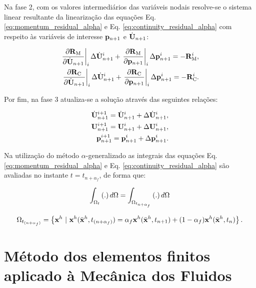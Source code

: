 \documentclass[tese_patricia]{subfiles}%
\begin{document}
Na fase 2, com os valores intermediários das variáveis nodais resolve-se o sistema linear resultante da linearização das equações Eq. \eqref{eq:momentum_residual_alpha} e Eq. \eqref{eq:continuity_residual_alpha} com respeito às variáveis de interesse $\mathbf{p}_{n+1}$ e $\dot{\mathbf{U}}_{n+1}$:

\begin{align}
\left .\frac{\partial\mathbf{R}_\mathrm{M}}{\partial\dot{\mathbf{U}}_{n+1}}\right|_{i} \Delta \dot{\mathbf{U}}_{n+1}^{i} + \left .\frac{\partial\mathbf{R}_\mathrm{M}}{\partial\mathbf{p}_{n+1}}\right|_{i} \Delta \mathbf{p}_{n+1}^{i} = -\mathbf{R}_\mathrm{M}^{i}, \label{eq:NR1} \\
\left .\frac{\partial\mathbf{R}_\mathrm{C}}{\partial\dot{\mathbf{U}}_{n+1}}\right|_{i} \Delta \dot{\mathbf{U}}_{n+1}^{i} + \left .\frac{\partial\mathbf{R}_\mathrm{C}}{\partial\mathbf{p}_{n+1}}\right|_{i} \Delta \mathbf{p}_{n+1}^{i} = -\mathbf{R}_\mathrm{C}^{i}.\label{eq:NR2}
\end{align}

Por fim, na fase 3 atualiza-se a solução através das seguintes relações:

\begin{align}
\dot{\mathbf{U}}_{n+1}^{i+1} = \dot{\mathbf{U}}_{n+1}^{i} + \Delta\dot{\mathbf{U}}_{n+1}^{i},\label{update1} \\ 
\mathbf{U}_{n+1}^{i+1} = \mathbf{U}_{n+1}^{i} + \Delta\mathbf{U}_{n+1}^{i},\label{update2}\\
\mathbf{p}_{n+1}^{i+1} = \mathbf{p}_{n+1}^{i} + \Delta\mathbf{p}_{n+1}^{i}.\label{update3}
\end{align}

Na utilização do método $\alpha$-generalizado as integrais das equações Eq. \eqref{eq:momentum_residual_alpha} e Eq. \eqref{eq:continuity_residual_alpha} são avaliadas no instante $t = t_{n+\alpha_{f}}$, de forma que:

\begin{align}
\int_{\Omega_{t}} \left(.\right) d\Omega = \int_{\Omega_{t_{n+\alpha_{f}}}} \left(.\right) d\Omega
\end{align}

\begin{align}
\Omega_{t_{(n+\alpha_f)}} = \left\{\mathbf{x}^h \  |\  \mathbf{x}^h(\bar{\mathbf{x}}^h,t_{(n+\alpha_f)}) = \alpha_f \mathbf{x}^h(\bar{\mathbf{x}}^h,t_{n+1}) + (1-\alpha_f) \mathbf{x}^h(\bar{\mathbf{x}}^h,t_n)  \right\}.
\end{align}

\section{Método dos elementos finitos aplicado à Mecânica dos Fluidos}
\end{document}
